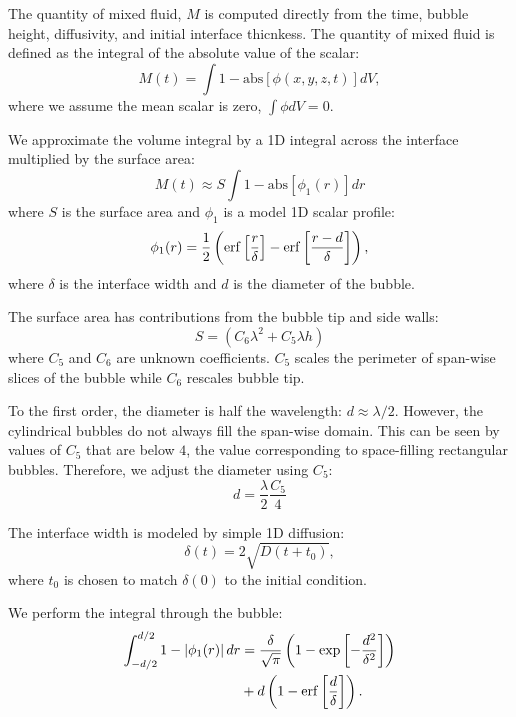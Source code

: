 The quantity of mixed fluid, $M$ is computed directly from the time, bubble height, diffusivity, and initial interface thicnkess.
The quantity of mixed fluid is defined as the integral of the absolute value of the scalar:
\begin{equation}
M(t) = \int 1-\text{abs}\left[\phi(x,y,z,t)\right] dV,
\end{equation}
where we assume the mean scalar is zero, $\int \phi dV = 0$.

We approximate the volume integral by a 1D integral across the interface multiplied by the surface area:
\begin{equation}
M(t) \approx S \int 1- \text{abs}\left[\phi_1(r)\right] dr
\end{equation}
where $S$ is the surface area and
$\phi_1$ is a model 1D scalar profile:
\begin{equation}
\phi_1(r) = \frac{1}{2} \left( \operatorname{erf}\left[\frac{r}{\delta}\right] - \operatorname{erf}\left[\frac{r - d}{\delta}\right] \right),
\end{equation}
where $\delta$ is the interface width and
$d$ is the diameter of the bubble.

The surface area has contributions from the bubble tip and side walls:
\begin{equation}
S = \left(C_6 \lambda^2 + C_5 \lambda h\right)
\end{equation}
where $C_5$ and $C_6$ are unknown coefficients.
$C_5$ scales the perimeter of span-wise slices of the bubble while $C_6$ rescales bubble tip.

To the first order, the diameter is half the wavelength: $d \approx \lambda / 2$.
However, the cylindrical bubbles do not always fill the span-wise domain.
This can be seen by values of $C_5$ that are below $4$, the value corresponding to space-filling rectangular bubbles.
Therefore, we adjust the diameter using $C_5$:
\begin{equation}
d = \frac{\lambda}{2} \frac{C_5}{4}
\end{equation}

The interface width is modeled by simple 1D diffusion:
\begin{equation}
\delta(t) = 2 \sqrt{D (t + t_0)},
\end{equation}
where $t_0$ is chosen to match $\delta(0)$ to the initial condition.

We perform the integral through the bubble:
\begin{equation}
\begin{split}
\int_{-d/2}^{d/2} 1- \left|\phi_1(r)\right| dr &= \frac{\delta}{\sqrt{\pi}} \left( 1 - \exp\left[-\frac{d^2}{\delta^2}\right]\right) \\
&+ d \left(1 - \operatorname{erf}\left[\frac{d}{\delta}\right]\right).
\end{split}
\end{equation}


